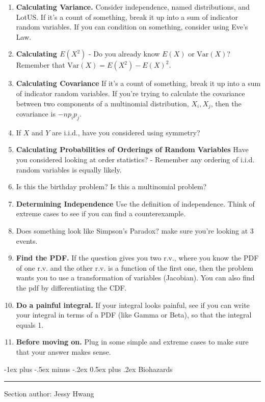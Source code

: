 \documentclass[10pt,landscape]{article}
\makeatletter
\newcommand{\var}{\textrm{Var}}
\renewcommand{\section}{\@startsection{section}{1}{0mm}%
                                {-1ex plus -.5ex minus -.2ex}%
                                {0.5ex plus .2ex}%
                                {\normalfont\large\bfseries}}
\makeatother
\begin{document}
\begin{multicols}{3}
\begin{enumerate}
\item \textbf{Calculating Variance.} Consider independence, named distributions, and LotUS. If it's a count of something, break it up into a sum of indicator random variables. If you can condition on something, consider using Eve's Law.
\item \textbf{Calculating $E(X^2)$} - Do you already know $E(X)$ or $\var(X)$? Remember that $\var(X) = E(X^2) - E(X)^2$.
\item \textbf{Calculating Covariance} If it's a count of something, break it up into a sum of indicator random variables. If you're trying to calculate the covariance between two components of a multinomial distribution, $X_i, X_j$, then the covariance is $-np_ip_j$.
\item If $X$ and $Y$ are i.i.d., have you considered using symmetry? 
\item \textbf{Calculating Probabilities of Orderings of Random Variables} Have you considered looking at order statistics? - Remember any ordering of i.i.d. random variables is equally likely.
\item Is this the birthday problem? Is this a multinomial problem?
\item \textbf{Determining Independence} Use the definition of independence. Think of extreme cases to see if you can find a counterexample.
\item Does something look like Simpson's Paradox? make sure you're looking at 3 events. 
\item \textbf{Find the PDF.} If the question gives you two r.v., where you know the PDF of one r.v. and the other r.v. is a function of the first one, then the problem wants you to use a transformation of variables (Jacobian). You can also find the pdf by differentiating the CDF.
\item \textbf{Do a painful integral.} If your integral looks painful, see if you can write your integral in terms of a PDF (like Gamma or Beta), so that the integral equals 1.
\item \textbf{Before moving on.} Plug in some simple and extreme cases to make sure that your answer makes sense.
\end{enumerate}


\section{Biohazards} \smallskip \hrule height 2pt \smallskip

Section author: Jessy Hwang


\end{multicols}
\end{document}
